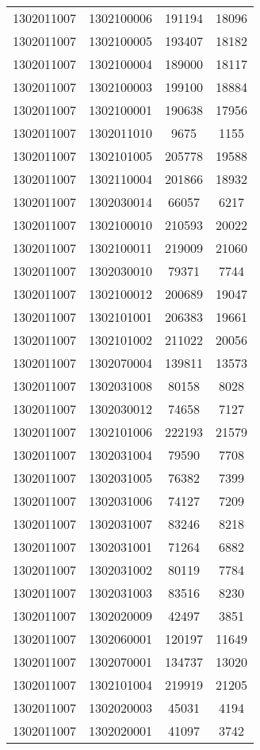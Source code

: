\begin{longtable}{llcc}
1302011007 & 1302100006 & 191194 & 18096\\
1302011007 & 1302100005 & 193407 & 18182\\
1302011007 & 1302100004 & 189000 & 18117\\
1302011007 & 1302100003 & 199100 & 18884\\
1302011007 & 1302100001 & 190638 & 17956\\
1302011007 & 1302011010 & 9675 & 1155\\
1302011007 & 1302101005 & 205778 & 19588\\
1302011007 & 1302110004 & 201866 & 18932\\
1302011007 & 1302030014 & 66057 & 6217\\
1302011007 & 1302100010 & 210593 & 20022\\
1302011007 & 1302100011 & 219009 & 21060\\
1302011007 & 1302030010 & 79371 & 7744\\
1302011007 & 1302100012 & 200689 & 19047\\
1302011007 & 1302101001 & 206383 & 19661\\
1302011007 & 1302101002 & 211022 & 20056\\
1302011007 & 1302070004 & 139811 & 13573\\
1302011007 & 1302031008 & 80158 & 8028\\
1302011007 & 1302030012 & 74658 & 7127\\
1302011007 & 1302101006 & 222193 & 21579\\
1302011007 & 1302031004 & 79590 & 7708\\
1302011007 & 1302031005 & 76382 & 7399\\
1302011007 & 1302031006 & 74127 & 7209\\
1302011007 & 1302031007 & 83246 & 8218\\
1302011007 & 1302031001 & 71264 & 6882\\
1302011007 & 1302031002 & 80119 & 7784\\
1302011007 & 1302031003 & 83516 & 8230\\
1302011007 & 1302020009 & 42497 & 3851\\
1302011007 & 1302060001 & 120197 & 11649\\
1302011007 & 1302070001 & 134737 & 13020\\
1302011007 & 1302101004 & 219919 & 21205\\
1302011007 & 1302020003 & 45031 & 4194\\
1302011007 & 1302020001 & 41097 & 3742\\

\end{longtable}

